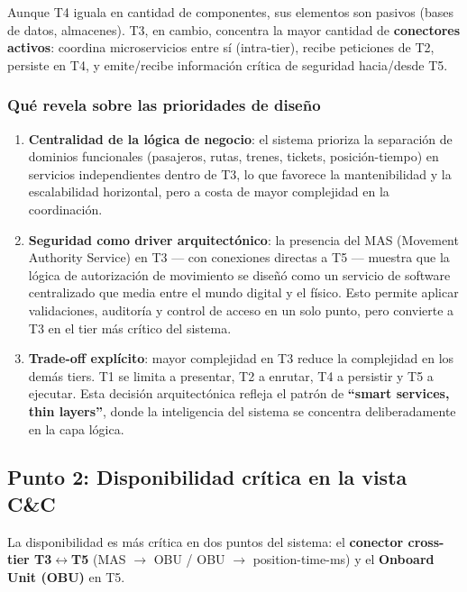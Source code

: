 \documentclass[a4paper, 10 pt]{article}
\begin{document}
Aunque T4 iguala en cantidad de componentes, sus elementos son pasivos (bases de datos, almacenes). T3, en cambio, concentra la mayor cantidad de \textbf{conectores activos}: coordina microservicios entre sí (intra-tier), recibe peticiones de T2, persiste en T4, y emite/recibe información crítica de seguridad hacia/desde T5.

\subsubsection{Qué revela sobre las prioridades de diseño}

\begin{enumerate}
    \item \textbf{Centralidad de la lógica de negocio}: el sistema prioriza la separación de dominios funcionales (pasajeros, rutas, trenes, tickets, posición-tiempo) en servicios independientes dentro de T3, lo que favorece la mantenibilidad y la escalabilidad horizontal, pero a costa de mayor complejidad en la coordinación.

    \item \textbf{Seguridad como driver arquitectónico}: la presencia del MAS (Movement Authority Service) en T3 --- con conexiones directas a T5 --- muestra que la lógica de autorización de movimiento se diseñó como un servicio de software centralizado que media entre el mundo digital y el físico. Esto permite aplicar validaciones, auditoría y control de acceso en un solo punto, pero convierte a T3 en el tier más crítico del sistema.

    \item \textbf{Trade-off explícito}: mayor complejidad en T3 reduce la complejidad en los demás tiers. T1 se limita a presentar, T2 a enrutar, T4 a persistir y T5 a ejecutar. Esta decisión arquitectónica refleja el patrón de \textbf{``smart services, thin layers''}, donde la inteligencia del sistema se concentra deliberadamente en la capa lógica.
\end{enumerate}

\subsection{Punto 2: Disponibilidad crítica en la vista C\&C}

La disponibilidad es más crítica en dos puntos del sistema: el \textbf{conector cross-tier T3$\leftrightarrow$T5} (MAS $\rightarrow$ OBU / OBU $\rightarrow$ position-time-ms) y el \textbf{Onboard Unit (OBU)} en T5.
\end{document}

